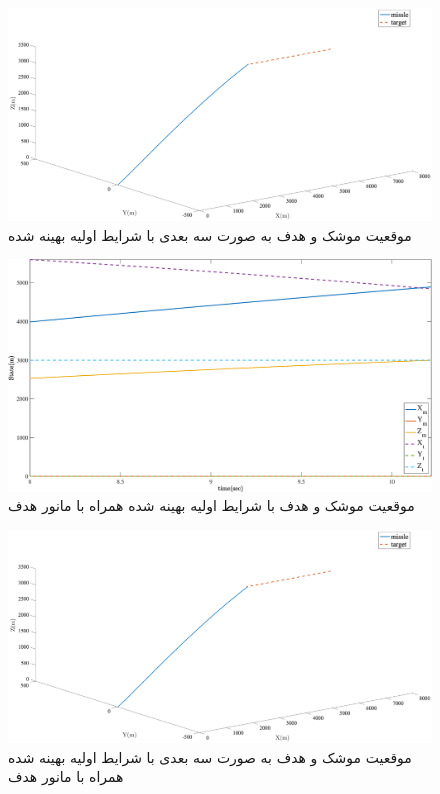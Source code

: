 \begin{figure}[H]
	\centering
	\includegraphics[width=\linewidth]{../Figure/b/3DoF_missle_vs_target_state}
	\caption{موقعیت موشک و هدف به صورت سه بعدی با شرایط اولیه بهینه شده}
\end{figure}

\begin{figure}[H]
	\centering
	\includegraphics[width=\linewidth]{../Figure/b/missle_vs_target_state_maneuver}
	\caption{موقعیت موشک و هدف با شرایط اولیه بهینه شده همراه با مانور هدف}
\end{figure}

\begin{figure}[H]
	\centering
	\includegraphics[width=\linewidth]{../Figure/b/3DoF_missle_vs_target_state_maneuver}
	\caption{موقعیت موشک و هدف به صورت سه بعدی با شرایط اولیه بهینه شده همراه با مانور هدف}
\end{figure}

